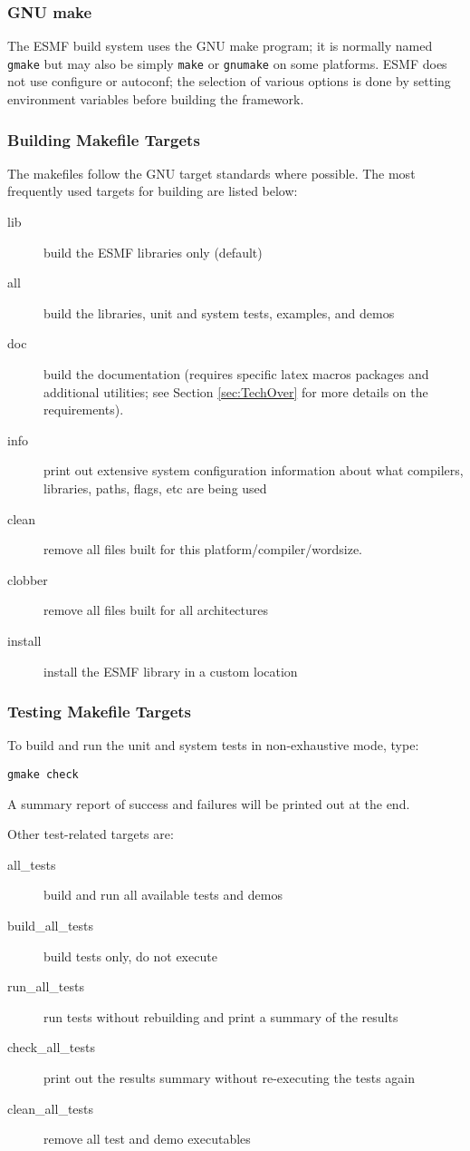 \subsubsection{GNU make}
The ESMF build system uses the GNU make program; it is normally named 
{\tt gmake} but may also be simply {\tt make} or {\tt gnumake} on some 
platforms.  ESMF does not use configure or autoconf;  the selection of 
various options is done by
setting environment variables before building the framework. 

\subsubsection{Building Makefile Targets}

The makefiles follow the GNU target standards where possible.
The most frequently used targets for building are listed below:
\begin{description}
\item[lib] build the ESMF libraries only (default)
\item[all] build the libraries, unit and system tests, examples, and demos
\item[doc] build the documentation (requires specific latex macros packages
and additional utilities; see Section \ref{sec:TechOver} for more details
on the requirements).  
\item[info] print out extensive system configuration information about what
           compilers, libraries, paths, flags, etc are being used
\item[clean] remove all files built for this platform/compiler/wordsize.
\item[clobber] remove all files built for all architectures
\item[install] install the ESMF library in a custom location
\end{description}


\subsubsection{Testing Makefile Targets}

To build and run the unit and system tests in non-exhaustive mode, type:
\begin{verbatim}
gmake check
\end{verbatim}
A summary report of success and failures will be printed out at the end.

\noindent Other test-related targets are:
\begin{description}
\item[all\_tests] build and run all available tests and demos
\item[build\_all\_tests] build tests only, do not execute
\item[run\_all\_tests] run tests without rebuilding and print a
summary of the results
\item[check\_all\_tests] 
print out the results summary without re-executing the tests again
\item[clean\_all\_tests] remove all test and demo executables 
\end{description}

